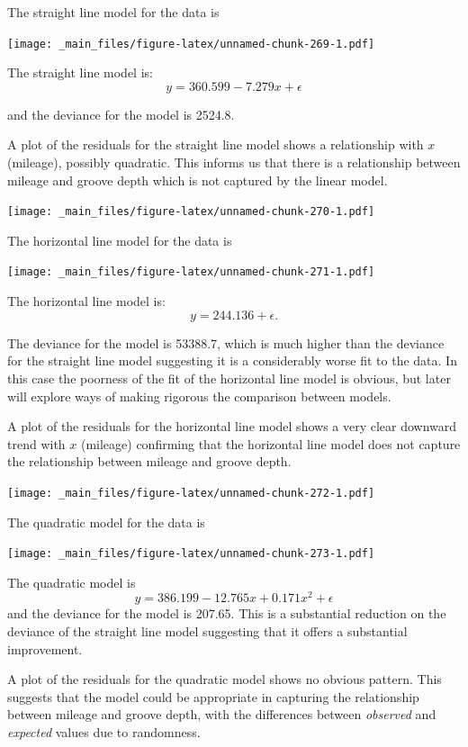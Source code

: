 \documentclass[
]{book}
\begin{document}
The straight line model for the data is

\texttt{[image: \_main\_files/figure-latex/unnamed-chunk-269-1.pdf]}

\hfill\break
The straight line model is:\\

\[ y= 360.599  -7.279 x + \epsilon \]

and the deviance for the model is 2524.8.

A plot of the residuals for the straight line model shows a relationship with \(x\) (mileage), possibly quadratic. This informs us that there is a relationship between mileage and groove depth which is not captured by the linear model.

\texttt{[image: \_main\_files/figure-latex/unnamed-chunk-270-1.pdf]}

The horizontal line model for the data is

\texttt{[image: \_main\_files/figure-latex/unnamed-chunk-271-1.pdf]}

The horizontal line model is:
\[ y= 244.136 +  \epsilon. \]

The deviance for the model is 53388.7, which is much higher than the deviance for the straight line model suggesting it is a considerably worse fit to the data. In this case the poorness of the fit of the horizontal line model is obvious, but later will explore ways of making rigorous the comparison between models.

A plot of the residuals for the horizontal line model shows a very clear downward trend with \(x\) (mileage) confirming that the horizontal line model does not capture the relationship between mileage and groove depth.

\texttt{[image: \_main\_files/figure-latex/unnamed-chunk-272-1.pdf]}

The quadratic model for the data is

\texttt{[image: \_main\_files/figure-latex/unnamed-chunk-273-1.pdf]}

\hfill\break
The quadratic model is
\[ y= 386.199  -12.765 x + 0.171 x^2 + \epsilon \]
and the deviance for the model is 207.65. This is a substantial reduction on the deviance of the straight line model suggesting that it offers a substantial improvement.

A plot of the residuals for the quadratic model shows no obvious pattern. This suggests that the model could be appropriate in capturing the relationship between mileage and groove depth, with the differences between \emph{observed} and \emph{expected} values due to randomness.
\end{document}
